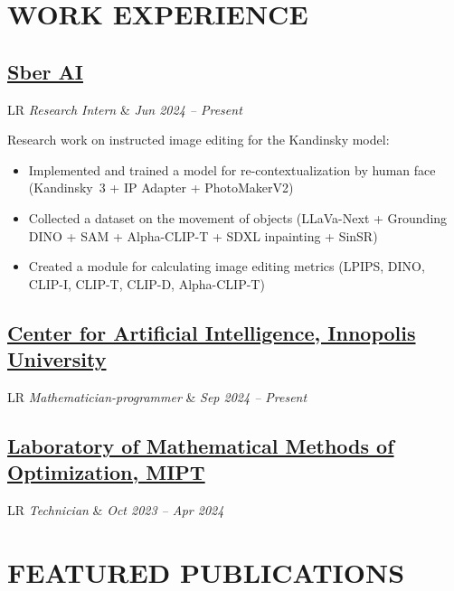 \documentclass[11pt,a4paper]{moderncv}
\newcommand*{\experienceentry}[4][1.5mm]{
    \subsection{#2} \vspace{-1.5mm}
    \begin{tabularx}{\textwidth}{LR}
        {\itshape #3} & {\itshape #4}
    \end{tabularx}
    \par\addvspace{#1}
}
\begin{document}
\maketitle
\vspace{-3em}

\begin{minipage}[t]{0.62\textwidth}

\section{WORK EXPERIENCE}
\experienceentry{\href{https://ai.sber.ru/en/about}{Sber AI}}{Research Intern}{Jun 2024 -- Present}{
    Research work on instructed image editing for the Kandinsky model:
    \begin{itemize}
        \item Implemented and trained a model for re-contextualization by human face (Kandinsky~3 + IP Adapter + PhotoMakerV2)
        \item Collected a dataset on the movement of objects (LLaVa-Next + Grounding DINO + SAM + Alpha-CLIP-T + SDXL inpainting + SinSR)
        \item Created a module for calculating image editing metrics (LPIPS, DINO, CLIP-I, CLIP-T, CLIP-D, Alpha-CLIP-T)
    \end{itemize}
}
\experienceentry{\href{https://innopolis.university/en/centerforartificialintelligence/}{Center for Artificial Intelligence, Innopolis University}}{Mathematician-programmer}{Sep 2024 -- Present}
\experienceentry{\href{https://labmmo.ru/en}{Laboratory of Mathematical Methods of Optimization, MIPT}}{Technician}{Oct 2023 -- Apr 2024}

\section{FEATURED PUBLICATIONS}


\end{minipage}
\end{document}
